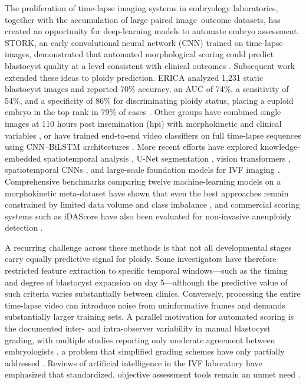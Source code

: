 \documentclass[11pt]{article}
\begin{document}
The proliferation of time-lapse imaging systems in embryology laboratories, together with the accumulation of large paired image--outcome datasets, has created an opportunity for deep-learning models to automate embryo assessment. STORK, an early convolutional neural network (CNN) trained on time-lapse images, demonstrated that automated morphological scoring could predict blastocyst quality at a level consistent with clinical outcomes \citep{khosravi2019deep}. Subsequent work extended these ideas to ploidy prediction. ERICA analyzed 1{,}231 static blastocyst images and reported 70\% accuracy, an AUC of 74\%, a sensitivity of 54\%, and a specificity of 86\% for discriminating ploidy status, placing a euploid embryo in the top rank in 79\% of cases \citep{chavezbadiola2020erica}. Other groups have combined single images at 110 hours post insemination (hpi) with morphokinetic and clinical variables \citep{barnes2023nonhinvasive}, or have trained end-to-end video classifiers on full time-lapse sequences using CNN--BiLSTM architectures \citep{lee2021endtoend, paya2023deeplearning}. More recent efforts have explored knowledge-embedded spatiotemporal analysis \citep{chen2023knowledge}, U-Net segmentation \citep{handayani2024unet}, vision transformers \citep{avidiansyah2025vit}, spatiotemporal CNNs \citep{maekawa2026aiprediction}, and large-scale foundation models for IVF imaging \citep{rajendran2025femi}. Comprehensive benchmarks comparing twelve machine-learning models on a morphokinetic meta-dataset have shown that even the best approaches remain constrained by limited data volume and class imbalance \citep{bamford2023ml12, zou2022timelapse}, and commercial scoring systems such as iDAScore have also been evaluated for non-invasive aneuploidy detection \citep{ma2024idascore}.

A recurring challenge across these methods is that not all developmental stages carry equally predictive signal for ploidy. Some investigators have therefore restricted feature extraction to specific temporal windows---such as the timing and degree of blastocyst expansion on day 5---although the predictive value of such criteria varies substantially between clinics. Conversely, processing the entire time-lapse video can introduce noise from uninformative frames and demands substantially larger training sets. A parallel motivation for automated scoring is the documented inter- and intra-observer variability in manual blastocyst grading, with multiple studies reporting only moderate agreement between embryologists \citep{paternot2009intra, paternot2011multicentre, hammond2020freeze}, a problem that simplified grading schemes have only partially addressed \citep{richardson2015grading}. Reviews of artificial intelligence in the IVF laboratory have emphasized that standardized, objective assessment tools remain an unmet need \citep{jiang2023airreview, paya2022contrastive, canat2024morphokinetic}.
\end{document}
